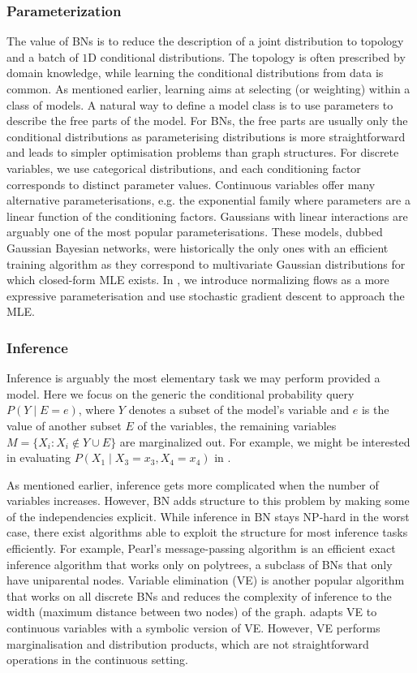 \subsubsection{Parameterization}
The value of BNs is to reduce the description of a joint distribution to topology and a batch of $1$D conditional distributions. The topology is often prescribed by domain knowledge, while learning the conditional distributions from data is common. As mentioned earlier, learning aims at selecting (or weighting) within a class of models. A natural way to define a model class is to use parameters to describe the free parts of the model. For BNs, the free parts are usually only the conditional distributions as parameterising distributions is more straightforward and leads to simpler optimisation problems than graph structures. For discrete variables, we use categorical distributions, and each conditioning factor corresponds to distinct parameter values. Continuous variables offer many alternative parameterisations, e.g. the exponential family where parameters are a linear function of the conditioning factors. Gaussians with linear interactions are arguably one of the most popular parameterisations. These models, dubbed Gaussian Bayesian networks, were historically the only ones with an efficient training algorithm as they correspond to multivariate Gaussian distributions \citep{wermuth1980linear} for which closed-form MLE exists. In , we introduce normalizing flows as a more expressive parameterisation and use stochastic gradient descent to approach the MLE.
\subsubsection{Inference}
Inference is arguably the most elementary task we may perform provided a model. Here we focus on the generic the conditional probability query $P(Y\mid E=e)$, where $Y$ denotes a subset of the model's variable and $e$ is the value of another subset $E$ of the variables, the remaining variables $M = \{X_i: X_i \notin Y \cup E \}$ are marginalized out. For example, we might be interested in evaluating $P(X_1\mid X_3=x_3, X_4=x_4)$ in .

As mentioned earlier, inference gets more complicated when the number of variables increases. However, BN adds structure to this problem by making some of the independencies explicit. While inference in BN stays NP-hard in the worst case, there exist algorithms able to exploit the structure for most inference tasks efficiently. For example, Pearl's message-passing algorithm is an efficient exact inference algorithm that works only on polytrees, a subclass of BNs that only have uniparental nodes. Variable elimination (VE) is another popular algorithm that works on all discrete BNs and reduces the complexity of inference to the width (maximum distance between two nodes) of the graph. \citet{sanner2012symbolic} adapts VE to continuous variables with a symbolic version of VE. However, VE performs marginalisation and distribution products, which are not straightforward operations in the continuous setting.

